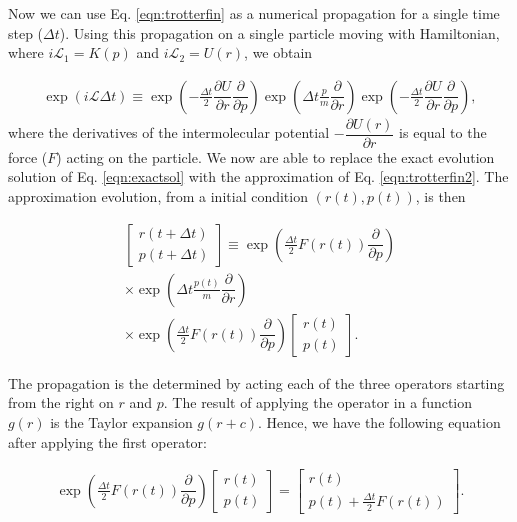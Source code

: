 Now we can use Eq. \ref{eqn:trotterfin} as a numerical propagation for a single time step ($\Delta t$). Using this propagation on a single particle moving with Hamiltonian, where $i\mathcal{L}_{1} = K (p)$ and $i\mathcal{L}_{2} = U (r)$, we obtain

\begin{equation}
\begin{aligned}
\exp (i\mathcal{L} \Delta t)  \equiv
\exp \left (-\frac{\Delta t}{2} \dfrac{\partial U}{\partial r} \dfrac{\partial}{\partial p} \right) \exp \left( \Delta t \frac{p}{m}\dfrac{\partial }{\partial r} \right)\exp \left (-\frac{\Delta t}{2} \dfrac{\partial U}{\partial r} \dfrac{\partial}{\partial p} \right) ,
\end{aligned}
\label{eqn:trotterfin2}
\end{equation} 
where the derivatives of the intermolecular potential $-\dfrac{\partial U(r)}{\partial r}$ is equal to the force ($F$) acting on the particle. We now are able to replace the exact evolution solution of Eq. \ref{eqn:exactsol} with the approximation of Eq. \ref{eqn:trotterfin2}. The approximation evolution, from a initial condition $(r(t),p(t))$, is then

\begin{equation}
\begin{aligned}
\left[ \begin{array}{c} r(t+ \Delta t) \\ p(t + \Delta t) \end{array} \right] \equiv 
\exp \left (\frac{\Delta t}{2} F(r(t)) \dfrac{\partial}{\partial p} \right) \\
\times \exp \left( \Delta t \frac{p(t)}{m}\dfrac{\partial }{\partial r} \right) \\
\times \exp \left (\frac{\Delta t}{2} F(r(t)) \dfrac{\partial}{\partial p} \right)
\left[ \begin{array}{c} r(t) \\ p(t) \end{array} \right] .
\end{aligned}
\end{equation}

The propagation is the determined by acting each of the three operators starting from the right on $r$ and $p$. The result of applying the operator in a function $g(r)$ is the Taylor expansion $g(r+c)$. Hence, we have the following equation after applying the first operator:

\begin{equation}
\begin{aligned}
\exp \left (\frac{\Delta t}{2} F(r(t)) \dfrac{\partial}{\partial p} \right)
\left[ \begin{array}{c} r(t) \\ p(t) \end{array} \right] = 
\left[ \begin{array}{c} r(t) \\ p(t) + \frac{\Delta t}{2} F(r(t)) \end{array} \right] .
\end{aligned}
\end{equation}

